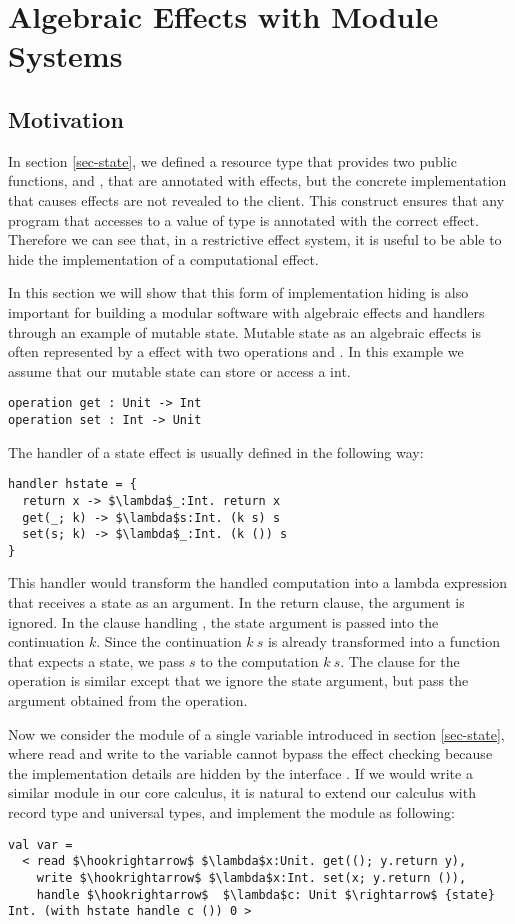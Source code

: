 
\chapter{Algebraic Effects with Module Systems}
\section{Motivation}
In section \ref{sec-state}, we defined a resource type  that provides two public functions,  and , that are annotated with effects, but the concrete implementation that causes effects are not revealed to the client. This construct ensures that any program that accesses to a value of type  is annotated with the correct effect. Therefore we can see that, in a restrictive effect system, it is useful to be able to hide the implementation of a computational effect.  

In this section we will show that this form of implementation hiding is also important for building a modular software with algebraic effects and handlers through an example of mutable state. Mutable state as an algebraic effects is often represented by a  effect with two operations  and . In this example we assume that our mutable state can store or access a int.
\begin{lstlisting}
operation get : Unit -> Int
operation set : Int -> Unit
\end{lstlisting}

The handler of a state effect is usually defined in the following way:
\begin{lstlisting}[mathescape=true]
handler hstate = {
  return x -> $\lambda$_:Int. return x
  get(_; k) -> $\lambda$s:Int. (k s) s
  set(s; k) -> $\lambda$_:Int. (k ()) s
}
\end{lstlisting}
This handler would transform the handled computation into a lambda expression that receives a state as an argument. In the return clause, the argument is ignored. In the clause handling ,  the state argument is passed into the continuation $k$. Since the continuation $k\ s$ is already transformed into a function that expects a state, we pass $s$ to the computation $k\ s$. The clause for the  operation is similar except that we ignore the state argument, but pass the argument obtained from the  operation. 

Now we consider the module of a single variable introduced in section \ref{sec-state}, where read and write to the variable cannot bypass the effect checking because the implementation details are hidden by the interface . If we would write a similar module in our core calculus, it is natural to extend our calculus with record type and universal types, and implement the module as following:
\begin{lstlisting}[mathescape=true]
val var = 
  < read $\hookrightarrow$ $\lambda$x:Unit. get((); y.return y),
    write $\hookrightarrow$ $\lambda$x:Int. set(x; y.return ()),
    handle $\hookrightarrow$  $\lambda$c: Unit $\rightarrow$ {state} Int. (with hstate handle c ()) 0 >
\end{lstlisting}

